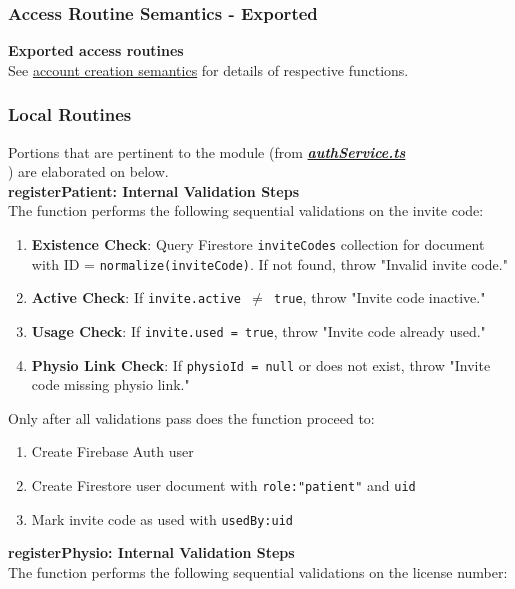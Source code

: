 \documentclass[12pt, titlepage]{article}
\begin{document}
\subsubsection{Access Routine Semantics - Exported}
\textbf{Exported access routines} \\
See \hyperref[sec:acARS]{account creation semantics} for details of respective functions.

\subsubsection{Local Routines}
Portions that are pertinent to the module (from \underline{\textbf{\textit{authService.ts}}} \\) are elaborated on below. \\

\noindent \textbf{registerPatient: Internal Validation Steps}\\
The function performs the following sequential validations on the invite code:

\begin{enumerate}
\item \textbf{Existence Check}: Query Firestore \texttt{inviteCodes} collection for document with ID = \texttt{normalize(inviteCode)}. If not found, throw "Invalid invite code."

\item \textbf{Active Check}: If \texttt{invite.active $\neq$ true}, throw "Invite code inactive."

\item \textbf{Usage Check}: If \texttt{invite.used = true}, throw "Invite code already used."

\item \textbf{Physio Link Check}: If \texttt{physioId = null} or does not exist, throw "Invite code missing physio link."

\end{enumerate}

Only after all validations pass does the function proceed to:
\begin{enumerate}
\item Create Firebase Auth user
\item Create Firestore user document with \texttt{role:"patient"} and \texttt{uid}
\item Mark invite code as used with \texttt{usedBy:uid}
\end{enumerate}

\noindent \textbf{registerPhysio: Internal Validation Steps}\\
The function performs the following sequential validations on the license number:
\end{document}
